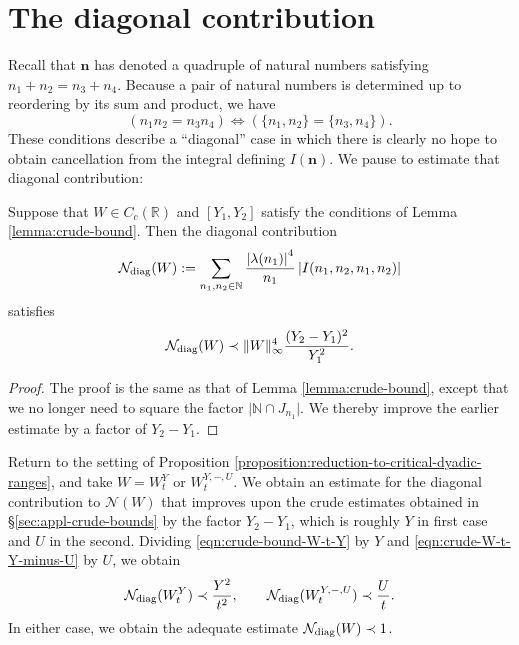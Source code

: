 \documentclass[reqno]{amsart} 
\begin{document}
\section{The diagonal contribution}
Recall that $\mathbf{n}$ has denoted a quadruple of natural numbers satisfying $n _1 + n _2 = n _3 + n _4$.  Because a pair of natural numbers is determined up to reordering by its sum and product, we have
\begin{equation*}
  (n_1 n_2 = n_3 n_4) \iff ( \{n_1, n_2\} = \{n_3, n_4\}).
\end{equation*}
These conditions describe a ``diagonal'' case in which there is clearly no hope to obtain cancellation from the integral defining $I(\mathbf{n})$.  We pause to estimate that diagonal contribution:
\begin{lemma}
  Suppose that $W \in C_c(\mathbb{R})$ and $[Y_1,Y_2]$ satisfy the conditions of Lemma \ref{lemma:crude-bound}.  Then the diagonal contribution
  \begin{equation*}
    \mathcal{N}_{\operatorname{diag}}(W) := \sum _{n_1, n_2 \in \mathbb{N}}
    \frac{\left\lvert \lambda (n _1 ) \right\rvert ^4 }{ n _1 } \left\lvert I (n _1, n _2, n _1, n _2 ) \right\rvert
  \end{equation*}
  satisfies
  \begin{equation*}
    \mathcal{N}_{\operatorname{diag}}(W)
    \prec \lVert W \rVert_{\infty}^4 \frac{(Y _2 - Y _1 ) ^2 }{Y_1 ^2}.
  \end{equation*}
\end{lemma}
\begin{proof}
  The proof is the same as that of Lemma \ref{lemma:crude-bound}, except that we no longer need to square the factor $\lvert \mathbb{N} \cap J _{n_1} \rvert$.  We thereby improve the earlier estimate by a factor of $Y_2 - Y_1$.
\end{proof}
Return to the setting of Proposition \ref{proposition:reduction-to-critical-dyadic-ranges}, and take $W = W_t^Y$ or $W_t^{Y,-,U}$.  We obtain an estimate for the diagonal contribution to $\mathcal{N}(W)$ that improves upon the crude estimates obtained in \S\ref{sec:appl-crude-bounds} by the factor $Y_2 - Y_1$, which is roughly $Y$ in first case and $U$ in the second.  Dividing \eqref{eqn:crude-bound-W-t-Y} by $Y$ and \eqref{eqn:crude-W-t-Y-minus-U} by $U$, we obtain
\begin{equation*}
  \mathcal{N}_{\operatorname{diag}} (W_t^Y) \prec \frac{Y^2}{t^2}, \qquad
  \mathcal{N}_{\operatorname{diag}} (W_t^{Y,-,U}) \prec \frac{U}{t}.
\end{equation*}
In either case, we obtain the adequate estimate $\mathcal{N}_{\operatorname{diag}}(W) \prec 1$.
\end{document}

